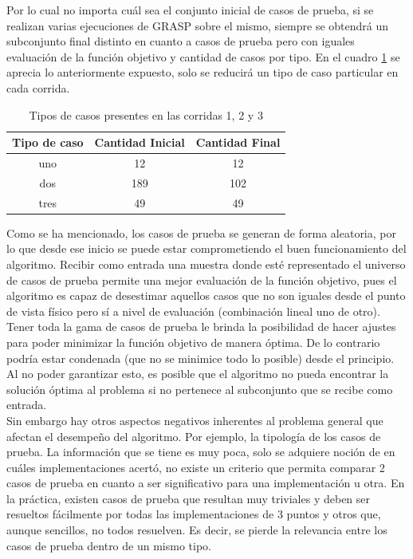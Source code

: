 \documentclass[a4paper,12pt]{book}
\begin{document}
 	Por lo cual no importa cuál sea el conjunto inicial de casos de prueba, si se realizan varias ejecuciones de GRASP sobre el mismo, siempre se obtendrá un subconjunto final distinto en cuanto a casos de prueba pero con iguales evaluación de la función objetivo y cantidad de casos por tipo. En el cuadro \ref{tab:Tiposdecasos123} se aprecia lo anteriormente expuesto, solo se reducirá un tipo de caso particular en cada corrida. \\
 	
 	\begin{table}[h]
 		\begin{center}
 			\begin{tabular}{| c | c | c |} \hline
 				Tipo de caso & Cantidad Inicial & Cantidad Final \\ \hline
 				uno & 12 & 12 \\
 				dos & 189 & 102 \\
 				tres & 49 & 49 \\ \hline
 			\end{tabular}
 			\caption{Tipos de casos presentes en las corridas 1, 2 y 3}
 			\label{tab:Tiposdecasos123}
 		\end{center}
 	\end{table}
 
	Como se ha mencionado, los casos de prueba se generan de forma aleatoria, por lo que desde ese inicio se puede estar comprometiendo el buen funcionamiento del algoritmo. Recibir como entrada una muestra donde esté representado el universo de casos de prueba permite una mejor evaluación de la función objetivo, pues el algoritmo es capaz de desestimar aquellos casos que no son iguales desde el punto de vista físico pero sí a nivel de evaluación (combinación lineal uno de otro). Tener toda la gama de casos de prueba le brinda la posibilidad de hacer ajustes para poder minimizar la función objetivo de manera óptima. De lo contrario podría estar condenada (que no se minimice todo lo posible) desde el principio. Al no poder garantizar esto, es posible que el algoritmo no pueda encontrar la solución óptima al problema si no pertenece al subconjunto que se recibe como entrada. \\
	
	Sin embargo hay otros aspectos negativos inherentes al problema general que afectan el desempeño del algoritmo. Por ejemplo, la tipología de los casos de prueba. La información que se tiene es muy poca, solo se adquiere noción de en cuáles implementaciones acertó, no existe un criterio que permita comparar 2 casos de prueba en cuanto a ser significativo para una implementación u otra. En la práctica, existen casos de prueba que resultan muy triviales y deben ser resueltos fácilmente por todas las implementaciones de 3 puntos y otros que, aunque sencillos, no todos resuelven. Es decir, se pierde la relevancia entre los casos de prueba dentro de un mismo tipo. \\
	
\end{document}
